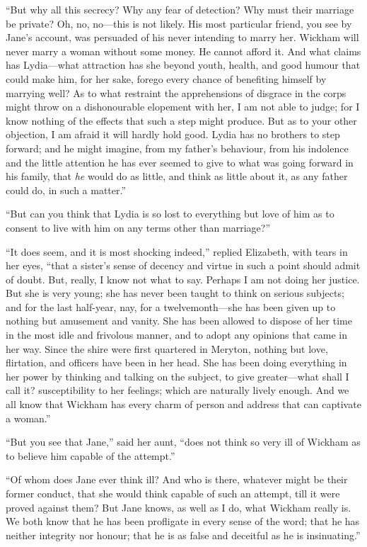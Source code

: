 ``But why all this secrecy?  Why any fear of detection?  Why must
their marriage be private?  Oh, no, no---this is not likely.
His most particular friend, you see by Jane's account, was
persuaded of his never intending to marry her.  Wickham will
never marry a woman without some money.  He cannot afford
it.  And what claims has Lydia---what attraction has she beyond
youth, health, and good humour that could make him, for her
sake, forego every chance of benefiting himself by marrying
well?  As to what restraint the apprehensions of disgrace in the
corps might throw on a dishonourable elopement with her, I am
not able to judge; for I know nothing of the effects that such a
step might produce.  But as to your other objection, I am afraid
it will hardly hold good.  Lydia has no brothers to step forward;
and he might imagine, from my father's behaviour, from his
indolence and the little attention he has ever seemed to give
to what was going forward in his family, that \emph{he} would do as
little, and think as little about it, as any father could do,
in such a matter.''

``But can you think that Lydia is so lost to everything but love
of him as to consent to live with him on any terms other than
marriage?''

``It does seem, and it is most shocking indeed,'' replied Elizabeth,
with tears in her eyes, ``that a sister's sense of decency and
virtue in such a point should admit of doubt.  But, really,
I know not what to say.  Perhaps I am not doing her justice.
But she is very young; she has never been taught to think
on serious subjects; and for the last half-year, nay, for a
twelvemonth---she has been given up to nothing but amusement
and vanity.  She has been allowed to dispose of her time in the
most idle and frivolous manner, and to adopt any opinions that
came in her way.  Since the \gdash{}shire were first quartered in
Meryton, nothing but love, flirtation, and officers have been
in her head.  She has been doing everything in her power by
thinking and talking on the subject, to give greater---what shall
I call it? susceptibility to her feelings; which are naturally
lively enough.  And we all know that Wickham has every charm of
person and address that can captivate a woman.''

``But you see that Jane,'' said her aunt, ``does not think so very
ill of Wickham as to believe him capable of the attempt.''

``Of whom does Jane ever think ill?  And who is there, whatever
might be their former conduct, that she would think capable of
such an attempt, till it were proved against them?  But Jane
knows, as well as I do, what Wickham really is.  We both know
that he has been profligate in every sense of the word; that he
has neither integrity nor honour; that he is as false and
deceitful as he is insinuating.''

